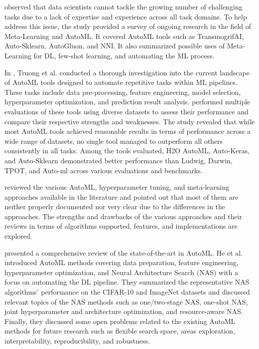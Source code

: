 \cite{9579526} observed that data scientists cannot tackle the growing number of challenging tasks due to a lack of expertise and experience across all task domains.
To help address this issue, the study provided a survey of ongoing research in the field of Meta-Learning and AutoML.
It covered AutoML tools such as TransmogrifAI, Auto-Sklearn, AutoGluon, and NNI.
It also summarized possible uses of Meta-Learning for DL, few-shot learning, and automating the ML process.

In \cite{8995391}, Truong et al. conducted a thorough investigation into the current landscape of AutoML tools designed to automate repetitive tasks within ML pipelines.
These tasks include data pre-processing, feature engineering, model selection, hyperparameter optimization, and prediction result analysis.
performed multiple evaluations of these tools using diverse datasets to assess their performance and compare their respective strengths and weaknesses.
The study revealed that while most AutoML tools achieved reasonable results in terms of performance across a wide range of datasets, no single tool managed to outperform all others consistently in all tasks.
Among the tools evaluated, H2O AutoML, Auto-Keras, and Auto-Sklearn demonstrated better performance than Ludwig, Darwin, TPOT, and Auto-ml across various evaluations and benchmarks.

\cite{9033810} reviewed the various AutoML, hyperparameter tuning, and meta-learning approaches available in the literature and pointed out that most of them are neither properly documented nor very clear due to the differences in the approaches.
The strengths and drawbacks of the various approaches and their reviews in terms of algorithms supported, features, and implementations are explored.

\cite{HE2021106622} presented a comprehensive review of the state-of-the-art in AutoML.
He et al. introduced AutoML methods covering data preparation, feature engineering, hyperparameter optimization, and Neural Architecture Search (NAS) with a focus on automating the DL pipeline.
They summarized the representative NAS algorithms' performance on the CIFAR-10 and ImageNet datasets and discussed relevant topics of the NAS methods such as one\slash two-stage NAS, one-shot NAS, joint hyperparameter and architecture optimization, and resource-aware NAS.
Finally, they discussed some open problems related to the existing AutoML methods for future research such as flexible search space, areas exploration, interpretability, reproducibility, and robustness.

